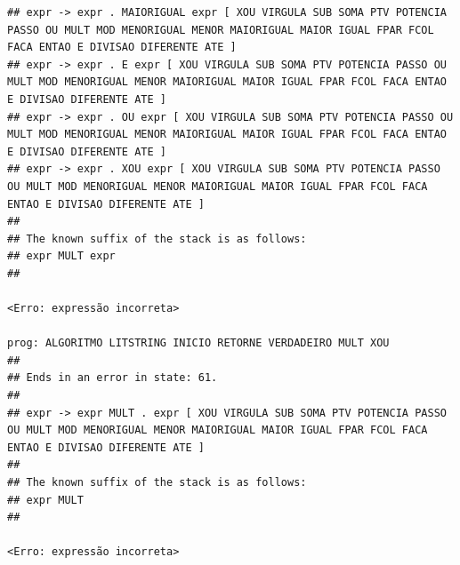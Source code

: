 \documentclass[hidelinks,12pt]{article}
\begin{document}
\begin{lstlisting}
## expr -> expr . MAIORIGUAL expr [ XOU VIRGULA SUB SOMA PTV POTENCIA PASSO OU MULT MOD MENORIGUAL MENOR MAIORIGUAL MAIOR IGUAL FPAR FCOL FACA ENTAO E DIVISAO DIFERENTE ATE ]
## expr -> expr . E expr [ XOU VIRGULA SUB SOMA PTV POTENCIA PASSO OU MULT MOD MENORIGUAL MENOR MAIORIGUAL MAIOR IGUAL FPAR FCOL FACA ENTAO E DIVISAO DIFERENTE ATE ]
## expr -> expr . OU expr [ XOU VIRGULA SUB SOMA PTV POTENCIA PASSO OU MULT MOD MENORIGUAL MENOR MAIORIGUAL MAIOR IGUAL FPAR FCOL FACA ENTAO E DIVISAO DIFERENTE ATE ]
## expr -> expr . XOU expr [ XOU VIRGULA SUB SOMA PTV POTENCIA PASSO OU MULT MOD MENORIGUAL MENOR MAIORIGUAL MAIOR IGUAL FPAR FCOL FACA ENTAO E DIVISAO DIFERENTE ATE ]
##
## The known suffix of the stack is as follows:
## expr MULT expr 
##

<Erro: expressão incorreta>

prog: ALGORITMO LITSTRING INICIO RETORNE VERDADEIRO MULT XOU 
##
## Ends in an error in state: 61.
##
## expr -> expr MULT . expr [ XOU VIRGULA SUB SOMA PTV POTENCIA PASSO OU MULT MOD MENORIGUAL MENOR MAIORIGUAL MAIOR IGUAL FPAR FCOL FACA ENTAO E DIVISAO DIFERENTE ATE ]
##
## The known suffix of the stack is as follows:
## expr MULT 
##

<Erro: expressão incorreta>


\end{lstlisting}
\end{document}
